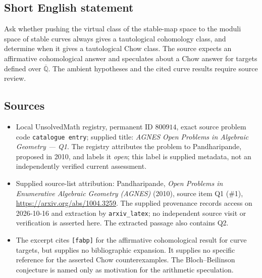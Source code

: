 \documentclass[11pt]{article}
\newcommand{\Q}{\mathbb{Q}}
\begin{document}
\subsection{Short English statement}
Ask whether pushing the virtual class of the stable-map space to the moduli space of stable curves always gives a tautological cohomology class, and determine when it gives a tautological Chow class. The source expects an affirmative cohomological answer and speculates about a Chow answer for targets defined over \(\overline{\Q}\). The ambient hypotheses and the cited curve results require source review.
\subsection{Sources}
\begin{itemize}
\item Local UnsolvedMath registry, permanent ID \(800914\), exact source problem code \texttt{catalogue entry}; supplied title: \emph{AGNES Open Problems in Algebraic Geometry --- Q1}. The registry attributes the problem to Pandharipande, proposed in 2010, and labels it \emph{open}; this label is supplied metadata, not an independently verified current assessment.
\item Supplied source-list attribution: Pandharipande, \emph{Open Problems in Enumerative Algebraic Geometry (AGNES)} (2010), source item Q1 (\#1), \url{https://arxiv.org/abs/1004.3259}. The supplied provenance records access on 2026-10-16 and extraction by \texttt{arxiv\_latex}; no independent source visit or verification is asserted here. The extracted passage also contains Q2.
\item The excerpt cites \texttt{[fabp]} for the affirmative cohomological result for curve targets, but supplies no bibliographic expansion. It supplies no specific reference for the asserted Chow counterexamples. The Bloch--Beilinson conjecture is named only as motivation for the arithmetic speculation.
\end{itemize}
\end{document}

